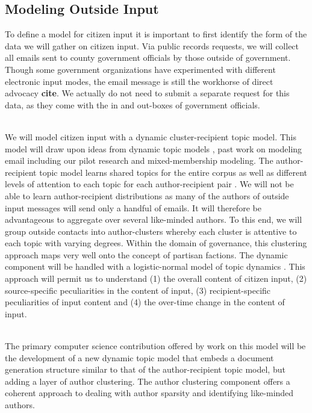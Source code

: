 \subsection{Modeling Outside Input}

 To define a model for citizen input it is important to first identify the form of the data we will gather on citizen input. Via public records requests, we will collect all emails sent to county government officials by those outside of government. Though some government organizations have experimented with different electronic input modes, the email message is still the workhorse of direct advocacy {\bf cite}. We actually do not need to submit a separate request for this data, as they come with the in and out-boxes of government officials. 

~\\
 We will model citizen input with a dynamic cluster-recipient topic model. This model will draw upon ideas from dynamic topic models \cite{Blei2006}, past work on modeling email \cite{McCallum2005} including our pilot research \cite{Krafft2012} and mixed-membership modeling. The author-recipient topic model learns shared topics for the entire corpus as well as different levels of attention to each topic for each author-recipient pair \cite{McCallum2005}. We will not be able to learn author-recipient distributions as many of the authors of outside input messages will send only a handful of emails. It will therefore be advantageous to aggregate over several like-minded authors. To this end, we will group outside contacts into author-clusters whereby each cluster is attentive to each topic with varying degrees. Within the domain of governance, this clustering approach maps very well onto the concept of partisan factions.  The dynamic component will be handled with a logistic-normal model of topic dynamics \cite{Blei2006}. This approach will permit us to understand (1) the overall content of citizen input, (2) source-specific peculiarities in the content of input, (3) recipient-specific peculiarities of input content and (4) the over-time change in the content of input.

~\\
 The primary computer science contribution offered by work on this model will be the development of a new dynamic topic model that embeds a document generation structure similar to that of the author-recipient topic model, but adding a layer of author clustering. The author clustering component offers a coherent approach to dealing with author sparsity and identifying like-minded authors.

